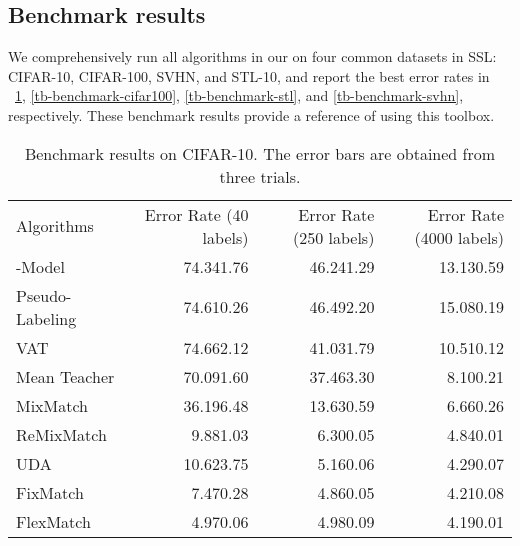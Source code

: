 \subsection{Benchmark results}

We comprehensively run all algorithms in our \codebase on four common datasets in SSL: CIFAR-10, CIFAR-100, SVHN, and STL-10, and report the best error rates in \tablename~\ref{tb-benchmark-cifar10}, \ref{tb-benchmark-cifar100}, \ref{tb-benchmark-stl}, and \ref{tb-benchmark-svhn}, respectively.
These benchmark results provide a reference of using this toolbox.

\begin{table}[h!]
\centering
\caption{Benchmark results on CIFAR-10. The error bars are obtained from three trials. }
\label{tb-benchmark-cifar10}
\begin{adjustbox}{width=\columnwidth,center}
\begin{tabular}{lrrr}
\toprule
Algorithms & Error Rate (40 labels) & Error Rate (250 labels) & Error Rate (4000 labels) \\  \cmidrule(r){1-1} \cmidrule(l){2-2} \cmidrule(l){3-3} \cmidrule(l){4-4}
-Model~\citep{rasmus2015semi}         &74.34{\scriptsize 1.76}     &46.24{\scriptsize 1.29}  &13.13{\scriptsize 0.59}    \\ 

Pseudo-Labeling~\citep{lee2013pseudo}     & 74.61{\scriptsize 0.26}     & 46.49{\scriptsize 2.20}    & 15.08{\scriptsize 0.19}   \\

VAT~\citep{miyato2018virtual} &74.66{\scriptsize 2.12}  &41.03{\scriptsize 1.79} &10.51{\scriptsize 0.12}   \\

Mean Teacher~\citep{tarvainen2017mean}    &70.09{\scriptsize 1.60}  &37.46{\scriptsize 3.30} &8.10{\scriptsize 0.21}    \\ 

MixMatch~\citep{berthelot2019mixmatch}      &36.19{\scriptsize 6.48} & 13.63{\scriptsize 0.59}  &6.66{\scriptsize 0.26}  \\ 

ReMixMatch~\citep{berthelot2019remixmatch}     &9.88{\scriptsize 1.03} &6.30{\scriptsize 0.05} &4.84{\scriptsize 0.01}       \\

UDA~\citep{xie2020unsupervised}                 & 10.62{\scriptsize 3.75}  & 5.16{\scriptsize 0.06}  & 4.29{\scriptsize 0.07}           \\

FixMatch~\citep{sohn2020fixmatch}            & 7.47{\scriptsize 0.28}  & 4.86{\scriptsize 0.05}  & 4.21{\scriptsize 0.08}           \\
FlexMatch           & 4.97{\scriptsize 0.06}  & 4.98{\scriptsize 0.09}  & 4.19{\scriptsize 0.01}           \\\bottomrule
\end{tabular}
\end{adjustbox}
\end{table}

